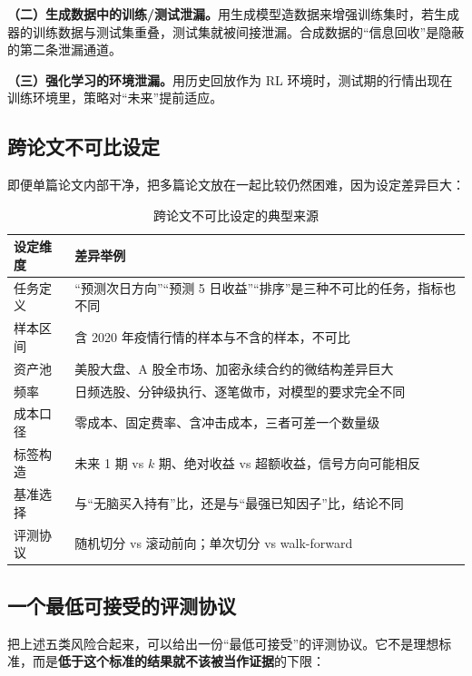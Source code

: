 \textbf{（二）生成数据中的训练/测试泄漏。}用生成模型造数据来增强训练集时，若生成器的训练数据与测试集重叠，测试集就被间接泄漏。合成数据的“信息回收”是隐蔽的第二条泄漏通道。

\textbf{（三）强化学习的环境泄漏。}用历史回放作为 RL 环境时，测试期的行情出现在训练环境里，策略对“未来”提前适应。

\subsection{跨论文不可比设定}

即便单篇论文内部干净，把多篇论文放在一起比较仍然困难，因为设定差异巨大：

\begin{table}[htbp]
\centering
\caption{跨论文不可比设定的典型来源}
\label{tab:incomparable}
\begin{tabular}{@{}>{\raggedright\arraybackslash}p{3.2cm}>{\raggedright\arraybackslash}p{11.4cm}@{}}
\toprule
设定维度 & 差异举例 \\
\midrule
任务定义 & “预测次日方向”“预测 5 日收益”“排序”是三种不可比的任务，指标也不同 \\
样本区间 & 含 2020 年疫情行情的样本与不含的样本，不可比 \\
资产池 & 美股大盘、A 股全市场、加密永续合约的微结构差异巨大 \\
频率 & 日频选股、分钟级执行、逐笔做市，对模型的要求完全不同 \\
成本口径 & 零成本、固定费率、含冲击成本，三者可差一个数量级 \\
标签构造 & 未来 1 期 vs $k$ 期、绝对收益 vs 超额收益，信号方向可能相反 \\
基准选择 & 与“无脑买入持有”比，还是与“最强已知因子”比，结论不同 \\
评测协议 & 随机切分 vs 滚动前向；单次切分 vs walk-forward \\
\bottomrule
\end{tabular}
\end{table}

\subsection{一个最低可接受的评测协议}

把上述五类风险合起来，可以给出一份“最低可接受”的评测协议。它不是理想标准，而是\textbf{低于这个标准的结果就不该被当作证据}的下限：

